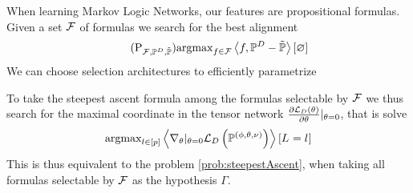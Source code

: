 

When learning Markov Logic Networks, our features are propositional formulas.
Given a set $\mathcal{F}$ of formulas we search for the best alignment 
\begin{align}\label{prob:steepestAscent}\tag{$\mathrm{P}_{\formulaset,\empdistribution,\currentdistribution}$}
	\argmax_{\formula\in\formulaset} \sbcontraction{\formula,\empdistribution-\currentdistribution}
\end{align}
We can choose selection architectures to efficiently parametrize 




%
To take the steepest ascent formula among the formulas selectable by $\mathcal{F}$ we thus search for the maximal coordinate in the tensor network $\frac{\partial \mathcal{L}_{D}\left(\theta\right)}{\partial \theta}|_{\theta=0}$, that is solve
\begin{align}
	\mathrm{argmax}_{l\in[p]} \left\langle  \nabla_{\theta}|_{\theta=0} \mathcal{L}_{D}\left(\mathbb{P}^{(\phi,\theta,\nu)}\right)
	\right\rangle \left[ L_{}=l_{} \right]
\end{align}
This is thus equivalent to the problem \ref{prob:steepestAscent}, when taking all formulas selectable by $\mathcal{F}$ as the hypothesis $\Gamma$.


